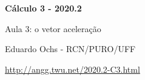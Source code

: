 \documentclass[oneside,12pt]{article}
\begin{document}


\long{}
\long{}
\long{}
\long{}
\long{}
\long{}
\long{}
\long{}
\long{}
\long{}

\long{}
\long{}

\def\frown{\ensuremath{{=}{(}}}
\def\True {\mathbf{V}}
\def\False{\mathbf{F}}

\def\drafturl{http://angg.twu.net/LATEX/2020-2-C3.pdf}
\def\drafturl{http://angg.twu.net/2020.2-C3.html}
\def\draftfooter{\tiny \href{\drafturl}{\jobname{}} \ColorBrown{\shorttoday{} \hours}}



%

\thispagestyle{empty}

\begin{center}

\vspace*{1.2cm}

{\bf \Large Cálculo 3 - 2020.2}

\bsk

Aula 3: o vetor aceleração

\bsk

Eduardo Ochs - RCN/PURO/UFF

\url{http://angg.twu.net/2020.2-C3.html}

\end{center}

\newpage
\end{document}

